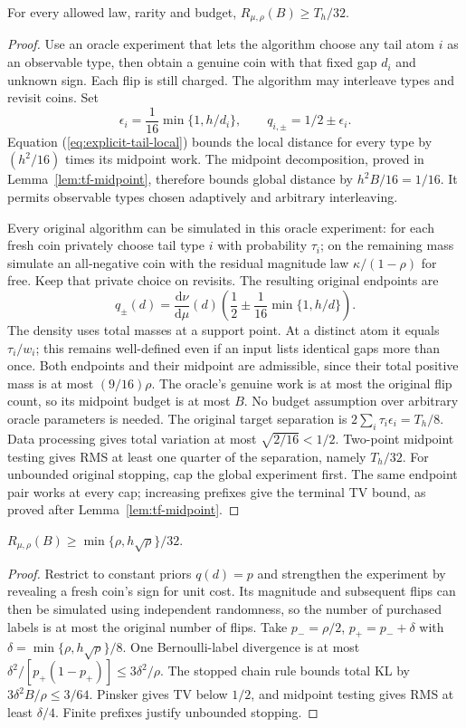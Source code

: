 \begin{lemma}\label{lem:tail}
For every allowed law, rarity and budget, $R_{\mu,\rho}(B)\ge T_h/32$.
\end{lemma}
\begin{proof}
Use an oracle experiment that lets the algorithm choose any tail atom
$i$ as an observable type, then obtain a genuine coin with that fixed
gap $d_i$ and unknown sign. Each flip is still charged. The algorithm
may interleave types and revisit coins.
Set
\[
 \epsilon_i=\frac1{16}\min\{1,h/d_i\},\qquad
 q_{i,\pm}=1/2\pm\epsilon_i.
\]
Equation (\ref{eq:explicit-tail-local}) bounds the local distance for
every type by $(h^2/16)$ times its midpoint work. The midpoint
decomposition, proved in Lemma~\ref{lem:tf-midpoint}, therefore bounds
global distance by $h^2B/16=1/16$. It permits observable types chosen
adaptively and arbitrary interleaving.

Every original algorithm can be simulated in this oracle experiment:
for each fresh coin privately choose tail type $i$ with probability
$\tau_i$; on the remaining mass simulate an all-negative coin with
the residual magnitude law $\kappa/(1-\rho)$ for free. Keep that
private choice on revisits. The resulting original endpoints are
\[
 q_\pm(d)=\frac{\mathrm d\nu}{\mathrm d\mu}(d)\left(\frac12\pm\frac1{16}\min\{1,h/d\}\right).
\]
The density uses total masses at a support point. At a distinct atom it
equals $\tau_i/w_i$; this remains well-defined even if an input lists
identical gaps more than once.
Both endpoints and their midpoint are admissible, since their total
positive mass is at most $(9/16)\rho$. The oracle's genuine work is
at most the original flip count, so its midpoint budget is at most $B$.
No budget assumption over arbitrary oracle parameters is needed.
The original target separation is
$2\sum_i\tau_i\epsilon_i=T_h/8$.
Data processing gives total variation at most
$\sqrt{2/16}<1/2$. Two-point midpoint testing gives RMS at least one
quarter of the separation, namely $T_h/32$.
For unbounded original stopping, cap the global experiment first.
The same endpoint pair works at every cap; increasing prefixes give
the terminal TV bound, as proved after Lemma~\ref{lem:tf-midpoint}.
\end{proof}

\begin{lemma}\label{lem:floor}
$R_{\mu,\rho}(B)\ge\min\{\rho,h\sqrt\rho\}/32$.
\end{lemma}
\begin{proof}
Restrict to constant priors $q(d)=p$ and strengthen the experiment by
revealing a fresh coin's sign for unit cost. Its magnitude and subsequent
flips can then be simulated using independent randomness, so the
number of purchased labels is at most the original number of flips.
Take $p_- =\rho/2$, $p_+=p_-+\delta$ with
$\delta=\min\{\rho,h\sqrt\rho\}/8$.
One Bernoulli-label divergence is at most
$\delta^2/[p_+(1-p_+)]\le3\delta^2/\rho$.
The stopped chain rule bounds total KL by $3\delta^2B/\rho\le3/64$.
Pinsker gives TV below $1/2$, and midpoint testing gives RMS
at least $\delta/4$. Finite prefixes justify unbounded stopping.
\end{proof}

